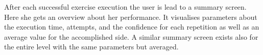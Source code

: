 After each successful exercise execution the user is lead to a summary screen. Here she gets an overview about her performance. It visualises parameters about the execution time, attempts, and the confidence for each repetition as well as an average value for the accomplished side. A similar summary screen exists also for the entire level with the same parameters but averaged.

